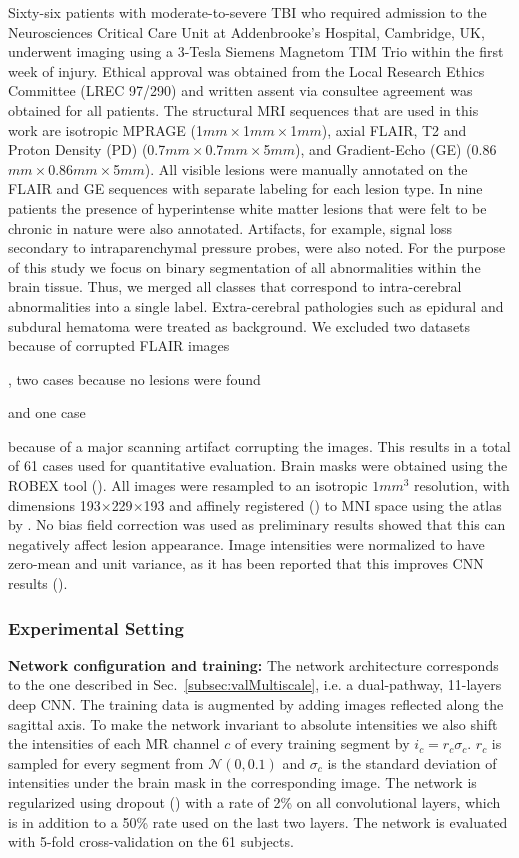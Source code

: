 Sixty-six patients  with moderate-to-severe TBI who required admission to the Neurosciences Critical Care Unit at Addenbrooke's Hospital, Cambridge, UK, underwent imaging using a 3-Tesla Siemens Magnetom TIM Trio within the first week of injury. Ethical approval was obtained from the Local Research Ethics Committee (LREC 97/290) and written assent via consultee agreement was obtained for all patients. The structural MRI sequences that are used in this work are isotropic MPRAGE (1$mm\times$1$mm\times$1$mm$), axial FLAIR, T2 and Proton Density (PD) (0.7$mm\times$0.7$mm\times$5$mm$), and Gradient-Echo (GE) (0.86$mm\times$0.86$mm\times$5$mm$). All visible lesions were manually annotated on the FLAIR and GE sequences with separate labeling for each lesion type. In nine patients the presence of hyperintense white matter lesions that were felt to be chronic in nature were also annotated. Artifacts, for example, signal loss secondary to intraparenchymal pressure probes, were also noted. For the purpose of this study we focus on binary segmentation of all abnormalities within the brain tissue. Thus, we merged all classes that correspond to intra-cerebral abnormalities into a single  label. Extra-cerebral pathologies such as epidural and subdural hematoma were treated as background. We excluded two datasets because of corrupted FLAIR images, two cases because no lesions were found and one case  because of a major scanning artifact corrupting the images. This results in a total of 61 cases used for quantitative evaluation. Brain masks were obtained using the ROBEX tool (\cite{Iglesias2011}). All images were resampled to an isotropic $1mm^3$ resolution, with dimensions 193$\times$229$\times$193 and affinely registered (\cite{Studholme1999}) to MNI space using the atlas by \cite{Grabner2006}. No bias field correction was used as preliminary results showed that this can negatively affect lesion appearance. Image intensities were normalized to have zero-mean and unit variance, as it has been reported that this improves CNN results (\cite{Jarrett2009}).

\subsubsection{Experimental Setting}
\label{subsubsec:tbiExperimentalSetting}

\textbf{Network configuration and training:} The network architecture corresponds to the one described in Sec.~\ref{subsec:valMultiscale}, i.e. a dual-pathway, 11-layers deep CNN. The training data is augmented by adding images reflected along the sagittal axis. To make the network invariant to absolute intensities we also shift the intensities of each MR channel $c$ of every training segment by $i_c = r_c \sigma_c$. $r_c$ is sampled for every segment from $\mathcal{N}(0,0.1)$ and $\sigma_c$ is the standard deviation of intensities under the brain mask in the corresponding image. The network is regularized using dropout (\cite{hinton2012dropout}) with a rate of 2\% on all convolutional layers, which is in addition to a 50\% rate used on the last two layers. The network is evaluated with 5-fold cross-validation on the 61 subjects.

